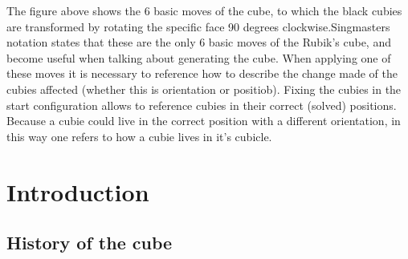\documentclass{article}
\begin{document}
\begin{figure}[h]
{
}
\end{figure}
\vspace{20pt}
\newline The figure above shows the 6 basic moves of the cube, to which the black cubies are transformed by rotating the specific face 90 degrees clockwise.Singmasters \cite{Magic} notation states that these are the only 6 basic moves of the Rubik's cube, and become useful when talking about generating the cube. When applying one of these moves it is necessary to reference how to describe the change made of the cubies affected (whether this is orientation or positiob). Fixing the cubies in the start configuration allows to reference cubies in their correct (solved) positions. Because a cubie could live in the correct position with a different orientation, in this way one refers to how a cubie lives in it's cubicle.

\section{Introduction}
\subsection{History of the cube}
\end{document}
